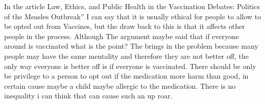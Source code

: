 \documentclass{article}
\begin{document}
In the article Law, Ethics, and Public Health in the Vaccination Debates: Politics of the Measles Outbreak” I can say that it is usually ethical for people to allow to be opted out from Vaccines, but the draw back to this is that it affects other people in the process. Although The argument maybe said that if everyone around is vaccinated what is the point? The brings in the problem because many people may have the same mentality and therefore they are not better off, the only way everyone is better off is if everyone is vaccinated. There should be only be privilege to a person to opt out if the medication more harm than good, in certain cause maybe a child maybe allergic to the medication. There is no inequality i can think that can cause such an up roar.
\end{document}
